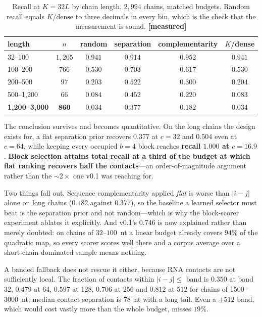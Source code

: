 \documentclass[11pt,a4paper]{article}
\newcommand{\meas}{\textcolor{measured}{\textbf{[measured]}}}
\begin{document}
\begin{table}[h]
\centering
\caption{Recall at $K = 32L$ by chain length, $2{,}994$ chains, matched budgets.
Random recall equals $K/\text{dense}$ to three decimals in every bin, which is
the check that the measurement is sound. \meas}
\small
\begin{tabular}{lccccc}
\toprule
\textbf{length} & \textbf{$n$} & \textbf{random} & \textbf{separation} &
\textbf{complementarity} & \textbf{$K$/dense} \\
\midrule
32--100      & $1{,}205$ & $0.941$ & $0.914$ & $0.952$ & $0.941$ \\
100--200     & $766$     & $0.530$ & $0.703$ & $0.617$ & $0.530$ \\
200--500     & $97$      & $0.203$ & $0.522$ & $0.300$ & $0.204$ \\
500--1{,}200 & $66$      & $0.084$ & $0.452$ & $0.220$ & $0.083$ \\
\textbf{1{,}200--3{,}000} & $\mathbf{860}$ & $\mathbf{0.034}$ &
$\mathbf{0.377}$ & $\mathbf{0.182}$ & $0.034$ \\
\bottomrule
\end{tabular}
\end{table}

\noindent
The conclusion survives and becomes quantitative. On the long chains the design
exists for, a flat separation prior recovers $0.377$ at $c=32$ and $0.504$ even
at $c=64$, while keeping every occupied $b{=}4$ block reaches
\textbf{recall $1.000$ at $c = 16.9$}. \textcolor{risk}{\textbf{Block selection
attains total recall at a third of the budget at which flat ranking recovers
half the contacts}}---an order-of-magnitude argument rather than the ${\sim}2\times$
one v0.1 was reaching for.

Two things fall out. Sequence complementarity applied \emph{flat} is worse than
$|i-j|$ alone on long chains ($0.182$ against $0.377$), so the baseline a
learned selector must beat is the separation prior and not random---which is why
the block-scorer experiment ablates it explicitly. And v0.1's $0.746$ is now
explained rather than merely doubted: on chains of $32$--$100$~nt a linear
budget already covers $94\%$ of the quadratic map, so every scorer scores well
there and a corpus average over a short-chain-dominated sample means nothing.

A banded fallback does not rescue it either, because RNA contacts are not
sufficiently local. The fraction of contacts within $|i-j| \leq$ band is $0.350$ at band 32,
$0.479$ at 64, $0.597$ at 128, $0.706$ at 256 and $0.812$ at 512 for chains of
1500--3000~nt; median contact separation is $78$~nt with a long tail. Even a
$\pm512$ band, which would cost vastly more than the whole budget, misses $19\%$.
\end{document}
